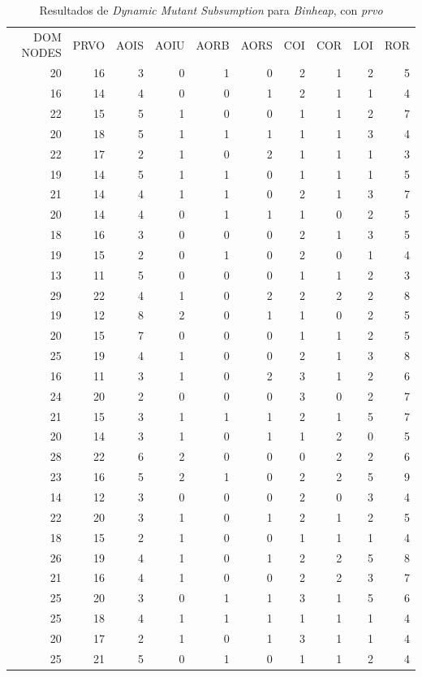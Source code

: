 \begin{table}[]
	\caption{Resultados de \emph{Dynamic Mutant Subsumption} para \emph{Binheap}, con \emph{prvo}}
	\label{tables.results.subsumption.binheap.prvo}
	\centering
	\scriptsize
	\def\arraystretch{0.95}
	\setlength\tabcolsep{0.5mm}
	\begin{tabular}{rrrrrrrrrr}
		DOM NODES & PRVO & AOIS & AOIU & AORB & AORS & COI & COR & LOI & ROR \\
		20 & 16 & 3 & 0 & 1 & 0 & 2 & 1 & 2 & 5 \\
		16 & 14 & 4 & 0 & 0 & 1 & 2 & 1 & 1 & 4 \\
		22 & 15 & 5 & 1 & 0 & 0 & 1 & 1 & 2 & 7 \\
		20 & 18 & 5 & 1 & 1 & 1 & 1 & 1 & 3 & 4 \\
		22 & 17 & 2 & 1 & 0 & 2 & 1 & 1 & 1 & 3 \\
		19 & 14 & 5 & 1 & 1 & 0 & 1 & 1 & 1 & 5 \\
		21 & 14 & 4 & 1 & 1 & 0 & 2 & 1 & 3 & 7 \\
		20 & 14 & 4 & 0 & 1 & 1 & 1 & 0 & 2 & 5 \\
		18 & 16 & 3 & 0 & 0 & 0 & 2 & 1 & 3 & 5 \\
		19 & 15 & 2 & 0 & 1 & 0 & 2 & 0 & 1 & 4 \\
		13 & 11 & 5 & 0 & 0 & 0 & 1 & 1 & 2 & 3 \\
		29 & 22 & 4 & 1 & 0 & 2 & 2 & 2 & 2 & 8 \\
		19 & 12 & 8 & 2 & 0 & 1 & 1 & 0 & 2 & 5 \\
		20 & 15 & 7 & 0 & 0 & 0 & 1 & 1 & 2 & 5 \\
		25 & 19 & 4 & 1 & 0 & 0 & 2 & 1 & 3 & 8 \\
		16 & 11 & 3 & 1 & 0 & 2 & 3 & 1 & 2 & 6 \\
		24 & 20 & 2 & 0 & 0 & 0 & 3 & 0 & 2 & 7 \\
		21 & 15 & 3 & 1 & 1 & 1 & 2 & 1 & 5 & 7 \\
		20 & 14 & 3 & 1 & 0 & 1 & 1 & 2 & 0 & 5 \\
		28 & 22 & 6 & 2 & 0 & 0 & 0 & 2 & 2 & 6 \\
		23 & 16 & 5 & 2 & 1 & 0 & 2 & 2 & 5 & 9 \\
		14 & 12 & 3 & 0 & 0 & 0 & 2 & 0 & 3 & 4 \\
		22 & 20 & 3 & 1 & 0 & 1 & 2 & 1 & 2 & 5 \\
		18 & 15 & 2 & 1 & 0 & 0 & 1 & 1 & 1 & 4 \\
		26 & 19 & 4 & 1 & 0 & 1 & 2 & 2 & 5 & 8 \\
		21 & 16 & 4 & 1 & 0 & 0 & 2 & 2 & 3 & 7 \\
		25 & 20 & 3 & 0 & 1 & 1 & 3 & 1 & 5 & 6 \\
		25 & 18 & 4 & 1 & 1 & 1 & 1 & 1 & 1 & 4 \\
		20 & 17 & 2 & 1 & 0 & 1 & 3 & 1 & 1 & 4 \\
		25 & 21 & 5 & 0 & 1 & 0 & 1 & 1 & 2 & 4
	\end{tabular}
\end{table}

